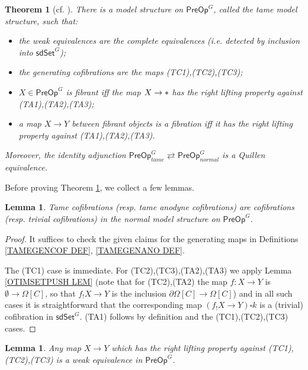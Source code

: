 \documentclass[a4paper,10pt
,draft
]{article}%
\numberwithin{equation}{section}
\numberwithin{figure}{section}
\newtheorem{theorem}[equation]{Theorem}%
\newtheorem{lemma}[equation]{Lemma}%
\theoremstyle{definition} %
\newcommand{\1}{\ensuremath{\mathbbm 1}}%
\begin{document}
\begin{theorem}[{cf. \cite[Thm. 7.19]{CM13b}}]\label{TAMEMS_THM}
	There is a model structure on 
	$\mathsf{PreOp}^G$,
	called the \emph{tame model structure},
	such that:
	\begin{itemize}
		\item the weak equivalences are the complete equivalences (i.e. detected by inclusion into 
		$\mathsf{sdSet}^G$);
		\item the generating cofibrations are the maps (TC1),(TC2),(TC3);
		\item $X \in \mathsf{PreOp}^G$ is fibrant iff
		the map $X \to \**$ has the right lifting property against 
		(TA1),(TA2),(TA3);
		\item a map $X \to Y$ between fibrant objects is a fibration iff
		it has the right lifting property against 
		(TA1),(TA2),(TA3).
	\end{itemize}
	Moreover, the identity adjunction
	$
	\mathsf{PreOp}^G_{tame} 
	\rightleftarrows
	\mathsf{PreOp}^G_{normal} 
	$
	is a Quillen equivalence.
\end{theorem}


Before proving Theorem \ref{TAMEMS_THM},
we collect a few lemmas.

\begin{lemma}\label{TAMECOFCOF_LEM}
	Tame cofibrations (resp. tame anodyne cofibrations) are  cofibrations (resp. trivial cofibrations) in the normal model structure on $\mathsf{PreOp}^G$.
\end{lemma}

\begin{proof}
	It suffices to check the given claims for the generating maps
	in Definitions \ref{TAMEGENCOF DEF}, \ref{TAMEGENANO DEF}.
	
	The (TC1) case is immediate.
	For (TC2),(TC3),(TA2),(TA3)
	we apply 
	Lemma \ref{OTIMSETPUSH LEM}
	(note that for (TC2),(TA2)
	the map $f\colon X \to Y$ is $\emptyset \to \Omega[C]$,
	so that $f_!X \to Y$ is the inclusion
	$\partial \Omega[C] \to \Omega[C]$)
	and in all such cases it is 
	straightforward that the 
	corresponding map $(f_!X \to Y) \square k$
	is a (trivial) cofibration in $\mathsf{sdSet}^G$.
	(TA1) follows by definition and the 
	(TC1),(TC2),(TC3) cases.
\end{proof}




\begin{lemma}\label{TAMETRIVFIB LEM}
	Any map $X \to Y$ which has the right lifting property against 
	(TC1),(TC2),(TC3)
	is a weak equivalence in 
	$\mathsf{PreOp}^G$.
\end{lemma}
\end{document}

